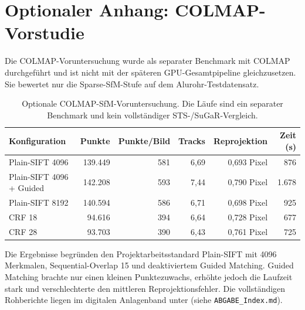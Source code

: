 \section{Optionaler Anhang: COLMAP-Vorstudie}

Die COLMAP-Voruntersuchung wurde als separater Benchmark mit COLMAP
\parencite{colmapProject} durchgeführt und ist
nicht mit der späteren GPU-Gesamtpipeline gleichzusetzen. Sie bewertet nur die
Sparse-SfM-Stufe auf dem Alurohr-Testdatensatz.

\begin{table}[H]
\centering
\small
\begin{tabularx}{\textwidth}{Xrrrrr}
\toprule
Konfiguration & Punkte & Punkte/Bild & Tracks & Reprojektion & Zeit (s)\\
\midrule
Plain-SIFT 4096 & 139.449 & 581 & 6,69 & 0,693 Pixel & 876\\
Plain-SIFT 4096 + Guided & 142.208 & 593 & 7,44 & 0,790 Pixel & 1.678\\
Plain-SIFT 8192 & 140.594 & 586 & 6,71 & 0,698 Pixel & 925\\
CRF 18 & 94.616 & 394 & 6,64 & 0,728 Pixel & 677\\
CRF 28 & 93.703 & 390 & 6,43 & 0,761 Pixel & 725\\
\bottomrule
\end{tabularx}
\caption{Optionale COLMAP-SfM-Voruntersuchung. Die Läufe sind ein separater
Benchmark und kein vollständiger STS-/SuGaR-Vergleich.}
\label{tab:colmap-vorstudie}
\end{table}

Die Ergebnisse begründen den Projektarbeitsstandard Plain-SIFT mit 4096
Merkmalen, Sequential-Overlap 15 und deaktiviertem Guided Matching. Guided
Matching brachte nur einen kleinen Punktezuwachs, erhöhte jedoch die Laufzeit
stark und verschlechterte den mittleren Reprojektionsfehler. Die vollständigen
Rohberichte liegen im digitalen Anlagenband unter 
(siehe \texttt{ABGABE\_Index.md}).
